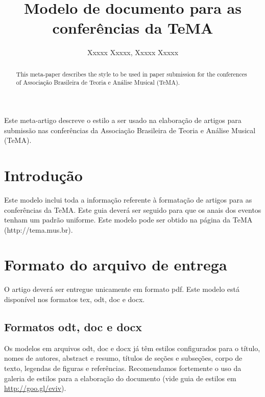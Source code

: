 \documentclass[12pt]{article}
\title{Modelo de documento para as conferências da TeMA}
\author{Xxxxx Xxxxx\inst{1}, Xxxxx Xxxxx\inst{1}}
\begin{document}
\maketitle

\begin{abstract}
  This meta-paper describes the style to be used in paper submission
  for the conferences of Associação Brasileira de Teoria e Análise
  Musical (TeMA).
\end{abstract}


\begin{resumo}
  Este meta-artigo descreve o estilo a ser usado na elaboração de
  artigos para submissão nas conferências da Associação Brasileira de
  Teoria e Análise Musical (TeMA).
\end{resumo}


\section{Introdução}
\label{sec:gen}

Este modelo inclui toda a informação referente à formatação de artigos
para as conferências da TeMA. Este guia deverá ser seguido para que os
anais dos eventos tenham um padrão uniforme. Este modelo pode ser
obtido na página da TeMA (http://tema.mus.br).

\section{Formato do arquivo de entrega}
\label{sec:formato-arquivo}

O artigo deverá ser entregue unicamente em formato pdf. Este modelo
está disponível nos formatos tex, odt, doc e docx.

\subsection{Formatos odt, doc e docx}
\label{sec:formatos-odt-doc}

Os modelos em arquivos odt, doc e docx já têm estilos configurados
para o título, nomes de autores, abstract e resumo, títulos de seções
e subseções, corpo de texto, legendas de figuras e referências.
Recomendamos fortemente o uso da galeria de estilos para a elaboração
do documento (vide guia de estilos em \url{http://goo.gl/eviv}).
\end{document}
